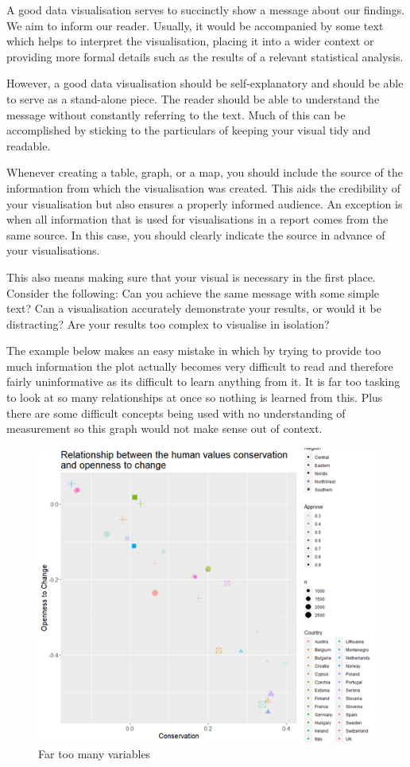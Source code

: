 \documentclass[
]{book}
\begin{document}
A good data visualisation serves to succinctly show a message about our findings. We aim to inform our reader. Usually, it would be accompanied by some text which helps to interpret the visualisation, placing it into a wider context or providing more formal details such as the results of a relevant statistical analysis.

However, a good data visualisation should be self-explanatory and should be able to serve as a stand-alone piece. The reader should be able to understand the message without constantly referring to the text. Much of this can be accomplished by sticking to the particulars of keeping your visual tidy and readable.

Whenever creating a table, graph, or a map, you should include the source of the information from which the visualisation was created. This aids the credibility of your visualisation but also ensures a properly informed audience. An exception is when all information that is used for visualisations in a report comes from the same source. In this case, you should clearly indicate the source in advance of your visualisations.

This also means making sure that your visual is necessary in the first place. Consider the following: Can you achieve the same message with some simple text? Can a visualisation accurately demonstrate your results, or would it be distracting? Are your results too complex to visualise in isolation?

The example below makes an easy mistake in which by trying to provide too much information the plot actually becomes very difficult to read and therefore fairly uninformative as its difficult to learn anything from it. It is far too tasking to look at so many relationships at once so nothing is learned from this. Plus there are some difficult concepts being used with no understanding of measurement so this graph would not make sense out of context.

\begin{figure}
\centering
\includegraphics{img/Too many variables.png}
\caption{Far too many variables}
\end{figure}
\end{document}
